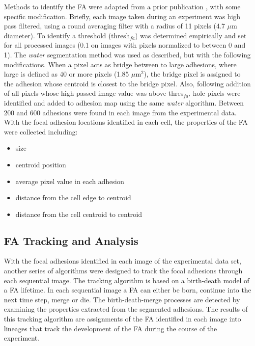 \documentclass[letterpaper,twocolumn]{article}
\begin{document}
Methods to identify the FA were adapted from a prior publication \cite{Zamir1999}, with some specific modification. Briefly, each image taken during an experiment was high pass filtered, using a round averaging filter with a radius of 11 pixels (4.7 $\mu$m diameter). To identify a threshold (thresh$_{fa}$) was determined empirically and set for all processed images (0.1 on images with pixels normalized to between 0 and 1). The \emph{water} segmentation method was used as described, but with the following modifications. When a pixel acts as bridge between to large adhesions, where large is defined as 40 or more pixels (1.85 $\mu$m$^2$), the bridge pixel is assigned to the adhesion whose centroid is closest to the bridge pixel. Also, following addition of all pixels whose high passed image value was above thres$_{fa}$, hole pixels were identified and added to adhesion map using the same \emph{water} algorithm. Between 200 and 600 adhesions were found in each image from the experimental data. With the focal adhesion locations identified in each cell, the properties of the FA were collected including: 

\begin{itemize}
\item size
\item centroid position
\item average pixel value in each adhesion 
\item distance from the cell edge to centroid
\item distance from the cell centroid to centroid
\end{itemize}

\subsection*{FA Tracking and Analysis}

With the focal adhesions identified in each image of the experimental data set, another series of algorithms were designed to track the focal adhesions through each sequential image. The tracking algorithm is based on a birth-death model of a FA lifetime. In each sequential image a FA can either be born, continue into the next time step, merge or die. The birth-death-merge processes are detected by examining the properties extracted from the segmented adhesions. The results of this tracking algorithm are assignments of the FA identified in each image into lineages that track the development of the FA during the course of the experiment.
\end{document}

